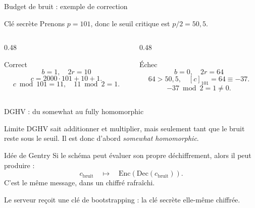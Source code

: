 \documentclass[10pt,aspectratio=169]{beamer}
\newcommand{\Enc}{\mathrm{Enc}}
\newcommand{\Dec}{\mathrm{Dec}}
\begin{document}
\begin{frame}{Budget de bruit : exemple de correction}
  \begin{block}{Clé secrète}
    Prenons $p=101$, donc le seuil critique est $p/2=50{,}5$.
  \end{block}

  \begin{columns}[T,onlytextwidth]
    \begin{column}{0.48\textwidth}
      \begin{exampleblock}{Correct}
        \[
          b=1,\quad 2r=10
        \]
        \[
          c=2000\cdot 101+10+1.
        \]
        \[
          c\bmod 101=11,\quad 11\bmod 2=1.
        \]
      \end{exampleblock}
    \end{column}
    \begin{column}{0.48\textwidth}
      \begin{block}{Échec}
        \[
          b=0,\quad 2r=64
        \]
        \[
          64>50{,}5,\quad [c]_{101}=64\equiv -37.
        \]
        \[
          -37\bmod 2=1\neq 0.
        \]
      \end{block}
    \end{column}
  \end{columns}
\end{frame}

\begin{frame}{DGHV : du somewhat au fully homomorphic}
  \begin{block}{Limite}
    DGHV sait additionner et multiplier, mais seulement tant que le bruit reste sous le seuil. Il est donc d'abord \textit{somewhat homomorphic}.
  \end{block}

  \begin{exampleblock}{Idée de Gentry}
    Si le schéma peut évaluer son propre déchiffrement, alors il peut produire :
    \[
      c_{\mathrm{bruit}}
      \quad \longmapsto \quad
      \Enc(\Dec(c_{\mathrm{bruit}})).
    \]
    C'est le même message, dans un chiffré rafraîchi.
  \end{exampleblock}

  Le serveur reçoit une clé de bootstrapping : la clé secrète elle-même chiffrée.
\end{frame}
\end{document}
